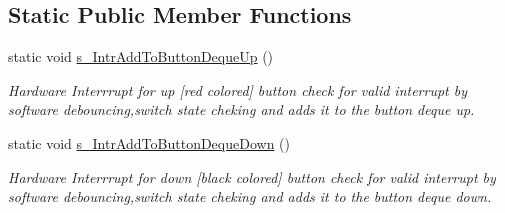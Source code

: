 \subsection*{Static Public Member Functions}
\begin{DoxyCompactItemize}
\item 
static void \hyperlink{classManualInteraction_ad040212df8364f6e9ef9462055b1da3f}{s\+\_\+\+Intr\+Add\+To\+Button\+Deque\+Up} ()
\begin{DoxyCompactList}\small\item\em Hardware Interrrupt for up \mbox{[}red colored\mbox{]} button check for valid interrupt by software debouncing,switch state cheking and adds it to the button deque up. \end{DoxyCompactList}\item 
static void \hyperlink{classManualInteraction_a9a6c72bc26699b16fc328bcacde931fb}{s\+\_\+\+Intr\+Add\+To\+Button\+Deque\+Down} ()
\begin{DoxyCompactList}\small\item\em Hardware Interrrupt for down \mbox{[}black colored\mbox{]} button check for valid interrupt by software debouncing,switch state cheking and adds it to the button deque down. \end{DoxyCompactList}\end{DoxyCompactItemize}
